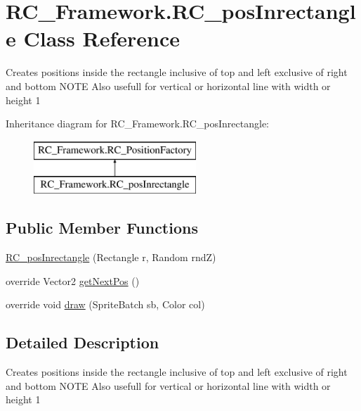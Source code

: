 \hypertarget{class_r_c___framework_1_1_r_c__pos_inrectangle}{}\section{R\+C\+\_\+\+Framework.\+R\+C\+\_\+pos\+Inrectangle Class Reference}
\label{class_r_c___framework_1_1_r_c__pos_inrectangle}


Creates positions inside the rectangle inclusive of top and left exclusive of right and bottom N\+O\+TE Also usefull for vertical or horizontal line with width or height 1  


Inheritance diagram for R\+C\+\_\+\+Framework.\+R\+C\+\_\+pos\+Inrectangle\+:\begin{figure}[H]
\begin{center}
\leavevmode
\includegraphics[height=2.000000cm]{class_r_c___framework_1_1_r_c__pos_inrectangle}
\end{center}
\end{figure}
\subsection*{Public Member Functions}
\begin{DoxyCompactItemize}
\item 
\mbox{\hyperlink{class_r_c___framework_1_1_r_c__pos_inrectangle_a45d6ba0898613aeb2b8d0762f33ad87b}{R\+C\+\_\+pos\+Inrectangle}} (Rectangle r, Random rndZ)
\item 
override Vector2 \mbox{\hyperlink{class_r_c___framework_1_1_r_c__pos_inrectangle_aafd0da0c3d4742c9aade81342125af81}{get\+Next\+Pos}} ()
\item 
override void \mbox{\hyperlink{class_r_c___framework_1_1_r_c__pos_inrectangle_ab5a236d69d4dc284f825e4e4d28908ec}{draw}} (Sprite\+Batch sb, Color col)
\end{DoxyCompactItemize}


\subsection{Detailed Description}
Creates positions inside the rectangle inclusive of top and left exclusive of right and bottom N\+O\+TE Also usefull for vertical or horizontal line with width or height 1 



